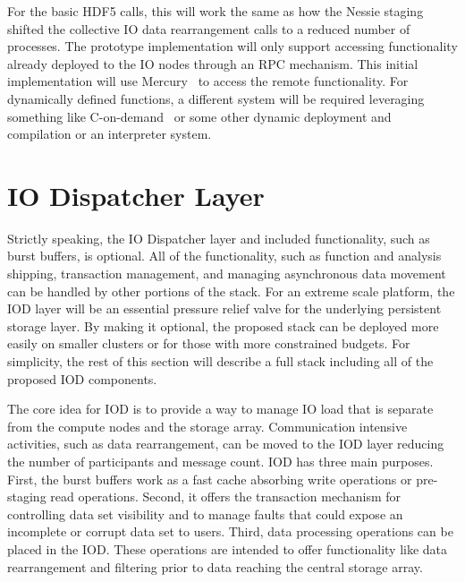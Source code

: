 \documentclass[conference]{IEEEtran} \pdfpagewidth=8.5in
\begin{document}
For the basic HDF5 calls, this will work the same as how the Nessie
staging~\cite{lofstead:2011:nessie-staging} shifted the collective IO data
rearrangement calls to a reduced number of processes. The prototype
implementation will only support accessing functionality already deployed to
the IO nodes through an RPC mechanism. This initial implementation will use
Mercury~\cite{Soumagne:2013:mercury} to access the remote functionality. For
dynamically defined functions, a different system will be required leveraging
something like C-on-demand~\cite{abbasi:2011:c-on-demand} or some other dynamic
deployment and compilation or an interpreter system.

\section{IO Dispatcher Layer}
\label{sec:iod}

Strictly speaking, the IO Dispatcher layer and included functionality, such as
burst buffers, is optional. All of the functionality, such as function and
analysis shipping, transaction management, and managing asynchronous data
movement can be handled by other portions of the stack. For an extreme scale
platform, the IOD layer will be an essential pressure relief valve for the
underlying persistent storage layer. By making it optional, the proposed stack
can be deployed more easily on smaller clusters or for those with more
constrained budgets. For simplicity, the rest of this section will describe a
full stack including all of the proposed IOD components.

The core idea for IOD is to provide a way to manage IO load that is
separate from the compute nodes and the storage array. Communication intensive
activities, such as data rearrangement, can be moved to the IOD layer
reducing the number of participants and message count. IOD has three main
purposes. First, the burst buffers work as a fast cache absorbing write
operations or pre-staging read operations.
Second, it offers the transaction mechanism for controlling data set visibility
and to manage faults that could expose an incomplete or corrupt data set to
users.
Third, data processing operations can be placed in the IOD.
These operations are intended to offer functionality like data rearrangement
and filtering prior to data reaching the central storage array.
\end{document}
